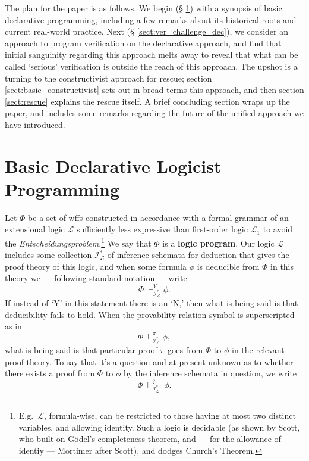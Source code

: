 \documentclass[11pt]{article}
\begin{document}
    The plan for the paper is as follows.  We begin (\S
    \ref{sect:basic_declarative}) with a synopsis of basic declarative
    programming, including a few remarks about its historical roots
    and current real-world practice.  Next (\S
    \ref{sect:ver_challenge_dec}), we consider an approach to program
    verification on the declarative approach, and find that initial
    sanguinity regarding this approach melts away to reveal that what
    can be called `serious' verification is outside the reach of this
    approach.  The upshot is a turning to the constructivist approach
    for rescue; section \ref{sect:basic_constructivist} sets out in
    broad terms this approach, and then section \ref{sect:rescue}
    explains the rescue itself.  A brief concluding section wraps up
    the paper, and includes some remarks regarding the future of the
    unified approach we have introduced.



  \section{Basic Declarative Logicist Programming}
  \label{sect:basic_declarative}

  \noindent
%
  Let $\Phi$ be a set of wffs constructed in accordance with a formal
  grammar of an extensional logic $\mathscr{L}$ sufficiently less
  expressive than first-order logic $\mathscr{L}_1$ to avoid the
  \textit{Entscheidungsproblem}.\footnote{E.g.\ $\mathscr{L}$,
    formula-wise, can be restricted to those having at most two
    distinct variables, and allowing identity.  Such a logic is
    decidable (as shown by Scott, who built on G\"{o}del's
    completeness theorem, and --- for the allowance of identiy ---
    Mortimer after Scott), and dodges Church's Theorem.} We say that
  $\Phi$ is a \textbf{logic program}.  Our logic $\mathscr{L}$
  includes some collection $\mathcal{I}^\ast_\mathscr{L}$ of inference
  schemata for deduction that gives the proof theory of this logic,
  and when some formula $\phi$ is deducible from $\Phi$ in this theory
  we --- following standard notation --- write
  $$\Phi\ \vdash_{\mathcal{I}^\ast_\mathscr{L}}^Y \phi.$$
%
  If instead of `Y' in this statement there is an `N,' then what is
  being said is that deducibility fails to hold.  When the provability
  relation symbol is superscripted as in
  $$\Phi\ \vdash_{\mathcal{I}^\ast_\mathscr{L}}^\pi \phi,$$
%
  what is being said is that particular proof $\pi$ goes from $\Phi$
  to $\phi$ in the relevant proof theory.  To say that it's a question
  and at present unknown as to whether there exists a proof from
  $\Phi$ to $\phi$ by the inference schemata in question, we write
  $$\Phi\ \vdash^?_{\mathcal{I}^\ast_\mathscr{L}}\ \phi.$$
%
\end{document}
